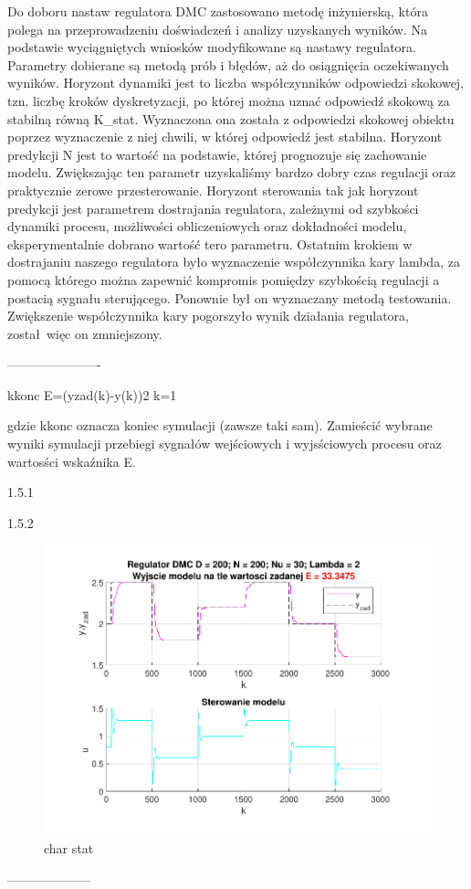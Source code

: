 Do doboru nastaw regulatora DMC zastosowano metodę inżynierską, 
która polega na przeprowadzeniu doświadczeń i analizy uzyskanych wyników. 
Na podstawie wyciągniętych wniosków modyfikowane są nastawy regulatora. 
Parametry  dobierane są metodą prób i błędów, aż do osiągnięcia oczekiwanych wyników.
Horyzont dynamiki jest to liczba współczynników odpowiedzi skokowej, tzn. liczbę kroków dyskretyzacji, po której można uznać odpowiedź skokową za stabilną równą K_stat. Wyznaczona ona została z odpowiedzi skokowej obiektu poprzez wyznaczenie z niej chwili, w której odpowiedź jest stabilna. Horyzont predykcji N jest to wartość na podstawie, której prognozuje się zachowanie modelu. Zwiększając ten parametr uzyskaliśmy bardzo dobry czas regulacji oraz praktycznie zerowe przesterowanie. Horyzont sterowania tak jak horyzont predykcji jest parametrem dostrajania regulatora, zależnymi od szybkości dynamiki procesu, możliwości obliczeniowych oraz dokładności modelu, eksperymentalnie dobrano wartość tero parametru. Ostatnim krokiem w dostrajaniu naszego regulatora było wyznaczenie współczynnika kary lambda, za pomocą którego można zapewnić kompromis pomiędzy szybkością regulacji a postacią sygnału sterującego. Ponownie był on wyznaczany metodą testowania. Zwiększenie współczynnika kary pogorszyło wynik działania regulatora, został więc on zmniejszony.


----------------------




kkonc
E=(yzad(k)-y(k))2
k=1


gdzie kkonc oznacza koniec symulacji (zawsze taki sam). 
Zamieścić wybrane wyniki symulacji 
przebiegi sygnałów wejściowych i 
wyjsściowych procesu oraz wartosści wskaźnika E. 

1.5.1 
 


1.5.2



\begin{figure}[H]
    \centering
    \includegraphics[scale=0.8]{../projekt/zad4_5/DMC_pdf/DMC_1.pdf}
    \caption{char stat}
\end{figure}


--------------------
